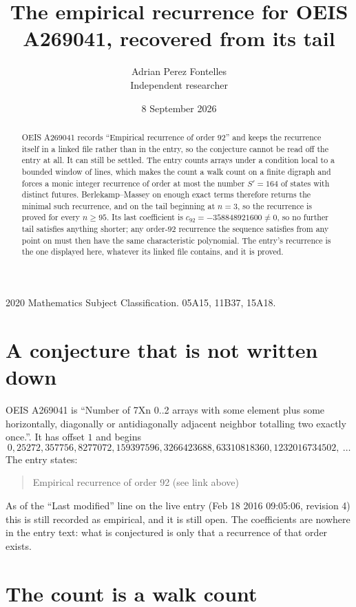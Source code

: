 \documentclass[11pt,a4paper]{article}
\title{The empirical recurrence for OEIS A269041, recovered from its tail}
\author{Adrian Perez Fontelles\\ \small Independent researcher}
\date{8 September 2026}
\theoremstyle{plain}
\theoremstyle{definition}
\begin{document}
\maketitle

\begin{abstract}
OEIS A269041 records ``Empirical recurrence of order $92$'' and keeps the recurrence itself in
a linked file rather than in the entry, so the conjecture cannot be read off the entry at all.
It can still be settled. The entry counts arrays under a condition local to a bounded window of
lines, which makes the count a walk count on a finite digraph and forces a monic integer
recurrence of order at most the number $S'=164$ of states with distinct futures. Berlekamp--Massey on
enough exact terms therefore returns the minimal such recurrence, and on the tail beginning at $n=3$, so the recurrence is proved for every $n\ge95$.
Its last coefficient is $c_{92}=-358848921600\neq0$, so no further tail satisfies anything
shorter; any order-$92$ recurrence the sequence satisfies from any point on must then have
the same characteristic polynomial. The entry's recurrence is the one displayed here, whatever
its linked file contains, and it is proved.
\end{abstract}

\noindent\small 2020 Mathematics Subject Classification. 05A15, 11B37, 15A18.\normalsize

\section{A conjecture that is not written down}

OEIS A269041 is ``Number of 7Xn 0..2 arrays with some element plus some horizontally, diagonally or antidiagonally adjacent neighbor totalling two exactly once.''. It has offset $1$ and begins
\[
0, 25272, 357756, 8277072, 159397596, 3266423688, 63310818360, 1232016734502,\ \dots
\]
The entry states:
\begin{quote}
Empirical recurrence of order 92 (see link above)
\end{quote}
As of the ``Last modified'' line on the live entry (Feb 18 2016 09:05:06, revision 4)
this is still recorded as empirical, and it is still open. The coefficients are nowhere in the
entry text: what is conjectured is only that a recurrence of that order exists.

\section{The count is a walk count}
\end{document}
